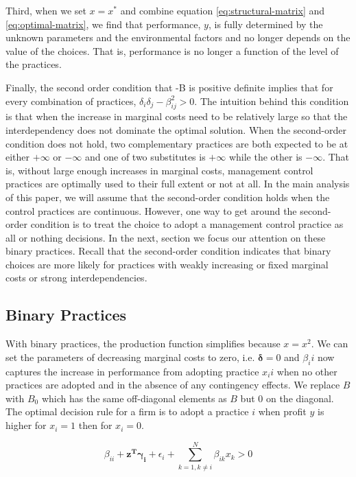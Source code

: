 \documentclass[12pt]{article}
\begin{document}
Third, when we set $x = x^*$ and combine equation \eqref{eq:structural-matrix} and \eqref{eq:optimal-matrix}, we find that performance, $y$, is fully determined by the unknown parameters and the environmental factors and no longer depends on the value of the choices. That is, performance is no longer a function of the level of the practices. 

Finally, the second order condition that -B is positive definite implies that for every combination of practices, $\delta_i \delta_j - \beta_{ij}^2 > 0$. The intuition behind this condition is that when the increase in marginal costs need to be relatively large so that the interdependency does not dominate the optimal solution. When the second-order condition does not hold, two complementary practices are both expected to be at either \(+\infty\) or \(-\infty\) and one of two substitutes is \(+\infty\) while the other is \(-\infty\). That is, without large enough increases in marginal costs, management control practices are optimally used to their full extent or not at all. In the main analysis of this paper, we will assume that the second-order condition holds when the control practices are continuous. However, one way to get around the second-order condition is to treat the choice to adopt a management control practice as all or nothing decisions. In the next, section we focus our attention on these binary practices. Recall that the second-order condition indicates that binary choices are more likely for practices with weakly increasing or fixed marginal costs or strong interdependencies.

\subsection{Binary Practices}

With binary practices, the production function simplifies because $x = x^2$. We can set the parameters of decreasing marginal costs to zero, i.e. $\mathbf{\delta} = 0$ and $\beta_ii$ now captures the increase in performance from adopting practice $x_ii$ when no other practices are adopted and in the absence of any contingency effects. We replace $B$ with $B_0$ which has the same off-diagonal elements as $B$ but $0$ on the diagonal. The optimal decision rule for a firm is to adopt a practice $i$ when profit $y$ is higher for $x_i = 1$ then for $x_i = 0$. 

\begin{equation} \label{eq:condition-binary}
    \beta_{ii} + \mathbf{z^T} \mathbf{\gamma_i} + \epsilon_i 
    + \sum^{N}_{k = 1, k \neq i} \beta_{ik} x_k > 0
\end{equation}
\end{document}
